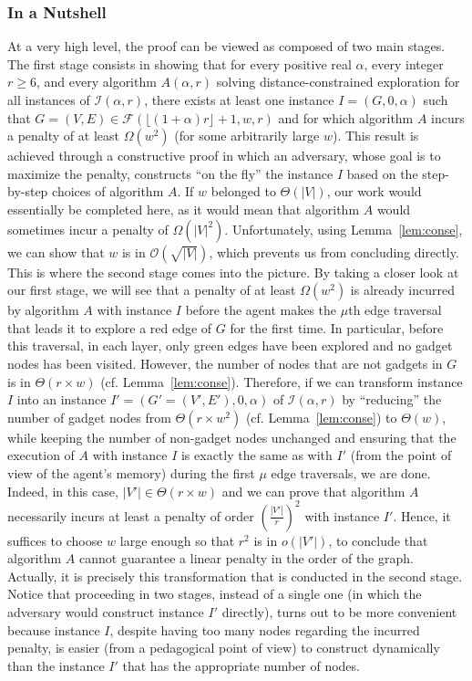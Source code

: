 \documentclass[11pt]{article}
\begin{document}
\subsubsection{In a Nutshell}
At a very high level, the proof can be viewed as composed of two main stages. The first stage consists in showing  that for every positive real $\alpha$, every integer $r \geq 6$, and every algorithm $A(\alpha, r)$ solving distance-constrained exploration for all instances of $\mathcal{I}(\alpha, r)$, there exists at least one instance $I=(G,0, \alpha)$ such that $G=(V,E) \in \mathcal{F}(\lfloor(1+\alpha)r\rfloor+1,w,r)$ and for which algorithm $A$ incurs a penalty of at least $\Omega(w^2)$ (for some arbitrarily large $w$). This result is achieved through a constructive proof in which an adversary, whose goal is to maximize the penalty, constructs ``on the fly'' the instance $I$ based on the step-by-step choices of algorithm $A$. If $w$ belonged to $\Theta(|V|)$, our work would essentially be completed here, as it would mean that algorithm $A$ would sometimes incur a penalty of $\Omega(|V|^2)$. Unfortunately, using Lemma~\ref{lem:conse}, we can show that $w$ is in $\mathcal{O}(\sqrt{|V|})$, which prevents us from concluding directly. This is where the second stage comes into the picture. By taking a closer look at our first stage, we will see that a penalty of at least $\Omega(w^2)$ is already incurred by algorithm $A$ with instance $I$ before the agent makes the $\mu$th edge traversal that leads it to explore a red edge of $G$ for the first time. In particular, before this traversal, in each layer, only green edges have been explored and no gadget nodes has been visited. However, the number of nodes that are not gadgets in $G$ is in $\Theta(r\times w)$ (cf. Lemma~\ref{lem:conse}). Therefore, if we can transform instance $I$ into an instance $I' = (G'=(V',E'),0, \alpha)$ of $\mathcal{I}(\alpha, r)$ by ``reducing'' the number of gadget nodes from $\Theta(r\times w^2)$ (cf. Lemma~\ref{lem:conse}) to $\Theta(w)$, while keeping the number of non-gadget nodes unchanged and ensuring that the execution of $A$ with instance $I$ is exactly the same as with $I'$ (from the point of view of the agent's memory) during the first $\mu$ edge traversals, we are done. Indeed, in this case, $|V'|\in \Theta(r\times w)$ and we can prove that algorithm $A$ necessarily incurs at least a penalty of order $\left(\frac{|V'|}{r}\right)^2$ with instance $I'$. Hence, it suffices to choose $w$ large enough so that $r^2$ is in $o(|V'|)$, to conclude that algorithm $A$ cannot guarantee a linear penalty in the order of the graph. Actually, it is precisely this transformation that is conducted in the second stage. Notice that proceeding in two stages, instead of a single one (in which the adversary would construct instance $I'$ directly), turns out to be more convenient because instance $I$, despite having too many nodes regarding the incurred penalty, is easier (from a pedagogical point of view) to construct dynamically than the instance $I'$ that has the appropriate number of nodes.
\end{document}
